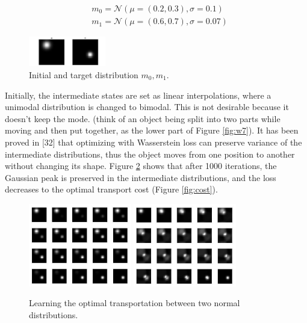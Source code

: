 \documentclass{article}
\begin{document}
\begin{equation}
\begin{aligned}
&m_0 = \mathcal{N}(\mu = (0.2,0.3), \sigma = 0.1) \\
&m_1 = \mathcal{N}(\mu = (0.6,0.7), \sigma = 0.07)
\end{aligned}
\end{equation}

\begin{figure}[htb!]
\centering
\includegraphics[width=0.3\textwidth]{FIGDRG/f0f1}
\caption{Initial and target distribution $m_0, m_1$.}
\label{fig:f0f1}
\end{figure}

Initially, the intermediate states are set as linear interpolations, where a unimodal distribution is changed to bimodal. This is not desirable because it doesn't keep the mode. (think of an object being split into two parts while moving and then put together, as the lower part of Figure \ref{fig:w7}). It has been proved in [32] that optimizing with Wasserstein loss can preserve variance of the intermediate distributions, thus the object moves from one position to another without changing its shape. Figure \ref{fig:iter} shows that after 1000 iterations, the Gaussian peak is preserved in the intermediate distributions, and the loss decreases to the optimal transport cost (Figure \ref{fig:cost}).

\begin{figure}[htb!]
\centering
{\includegraphics[width=0.4\textwidth]{FIGDRG/iter0}
}
\hfil
{\includegraphics[width=0.4\textwidth]{FIGDRG/iter1000}
\\ \qquad {} \qquad {}
}
\caption{Learning the optimal transportation between two normal distributions.}
\label{fig:iter}
\end{figure}
\end{document}
